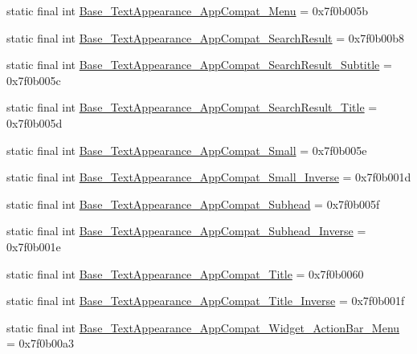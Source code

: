 \begin{CompactItemize}
\item 
static final int \hyperlink{classandroid_1_1support_1_1graphics_1_1drawable_1_1animated_1_1_r_1_1style_39370f42326ecc7f97866e2e07cf4f7e}{Base\_\-TextAppearance\_\-AppCompat\_\-Menu} = 0x7f0b005b
\item 
static final int \hyperlink{classandroid_1_1support_1_1graphics_1_1drawable_1_1animated_1_1_r_1_1style_64117e02fa72534a182cef433c413bb4}{Base\_\-TextAppearance\_\-AppCompat\_\-SearchResult} = 0x7f0b00b8
\item 
static final int \hyperlink{classandroid_1_1support_1_1graphics_1_1drawable_1_1animated_1_1_r_1_1style_c1ffea862329d652757b2d395b130c92}{Base\_\-TextAppearance\_\-AppCompat\_\-SearchResult\_\-Subtitle} = 0x7f0b005c
\item 
static final int \hyperlink{classandroid_1_1support_1_1graphics_1_1drawable_1_1animated_1_1_r_1_1style_abbc8d4f30cb39cda05b35950f8d5ada}{Base\_\-TextAppearance\_\-AppCompat\_\-SearchResult\_\-Title} = 0x7f0b005d
\item 
static final int \hyperlink{classandroid_1_1support_1_1graphics_1_1drawable_1_1animated_1_1_r_1_1style_24c7770ecd3ac8d1077abffe96238f41}{Base\_\-TextAppearance\_\-AppCompat\_\-Small} = 0x7f0b005e
\item 
static final int \hyperlink{classandroid_1_1support_1_1graphics_1_1drawable_1_1animated_1_1_r_1_1style_edc4d95e2a1cf9040f7391c3346f9113}{Base\_\-TextAppearance\_\-AppCompat\_\-Small\_\-Inverse} = 0x7f0b001d
\item 
static final int \hyperlink{classandroid_1_1support_1_1graphics_1_1drawable_1_1animated_1_1_r_1_1style_c73b8fd7ae53071dd862847cfaa799c4}{Base\_\-TextAppearance\_\-AppCompat\_\-Subhead} = 0x7f0b005f
\item 
static final int \hyperlink{classandroid_1_1support_1_1graphics_1_1drawable_1_1animated_1_1_r_1_1style_53fd210ce7bde4114c99bc046a25ee8f}{Base\_\-TextAppearance\_\-AppCompat\_\-Subhead\_\-Inverse} = 0x7f0b001e
\item 
static final int \hyperlink{classandroid_1_1support_1_1graphics_1_1drawable_1_1animated_1_1_r_1_1style_86233166e7e46a2319d25d5091872108}{Base\_\-TextAppearance\_\-AppCompat\_\-Title} = 0x7f0b0060
\item 
static final int \hyperlink{classandroid_1_1support_1_1graphics_1_1drawable_1_1animated_1_1_r_1_1style_c2816ac32bb4ffea7aa093d64602a6ce}{Base\_\-TextAppearance\_\-AppCompat\_\-Title\_\-Inverse} = 0x7f0b001f
\item 
static final int \hyperlink{classandroid_1_1support_1_1graphics_1_1drawable_1_1animated_1_1_r_1_1style_7867b7618fa964d7e1fd936bf51a51c9}{Base\_\-TextAppearance\_\-AppCompat\_\-Widget\_\-ActionBar\_\-Menu} = 0x7f0b00a3

\end{CompactItemize}

